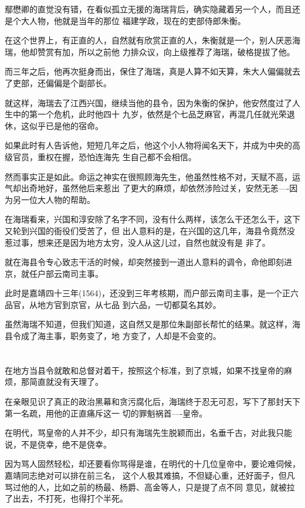 \documentclass[11pt,a4paper,onecolumn]{article}
\begin{document}
鄢懋卿的直觉没有错，在看似孤立无援的海瑞背后，确实隐藏着另一个人，而且还是个大人物，他就是当年的那位
福建学政，现在的吏部侍郎朱衡。

在这个世界上，有正直的人，自然就有欣赏正直的人，朱衡就是一个，别人厌恶海瑞，他却赞赏有加，所以之前他
力排众议，向上级推荐了海瑞，破格提拔了他。

而三年之后，他再次挺身而出，保住了海瑞，真是人算不如天算，朱大人偏偏就去了吏部，还偏偏是个副部长。

就这样，海瑞去了江西兴国，继续当他的县令，因为朱衡的保护，他安然度过了人生中的第一个危机，此时他四十
九岁，依然是个七品芝麻官，再混几任就光荣退休，这似乎已是他的宿命。

如果此时有人告诉他，短短几年之后，他这个小人物将闻名天下，并成为中央的高级官员，重权在握，恐怕连海先
生自己都不会相信。

然而事实正是如此。命运之神实在很照顾海先生，他虽然性格不对，天赋不高，运气却出奇地好，虽然他后来惹出
了更大的麻烦，却依然涉险过关，安然无恙----因为另一位大人物的帮助。

在海瑞看来，兴国和淳安除了名字不同，没有什么两样，该怎么干还怎么干，这下又轮到兴国的衙役们受苦了，但
出人意料的是，在兴国的这几年，海县令竟然没惹过事，想来还是因为地方太穷，没人从这儿过，自然也就没有是
非了。

就在海县令专心致志干活的时候，却突然接到一道出人意料的调令，命他即刻进京，就任户部云南司主事。

此时是嘉靖四十三年(1564)，还没到三年考核期，而户部云南司主事，是一个正六品官，从地方官到京官，从七品
到六品，一切都莫名其妙。

虽然海瑞不知道，但我们知道，这自然又是那位朱副部长帮忙的结果。就这样，海县令成了海主事，职务变了，地
方变了，人却是不会变的。

\section[\thesection]{}

在地方当县令就敢和总督对着干，按照这个标准，到了京城，如果不找皇帝的麻烦，那简直就没有天理了。

在亲眼见识了真正的政治黑幕和贪污腐化后，海瑞终于忍无可忍，写下了那封天下第一名疏，用他的正直痛斥这一
切的罪魁祸首----皇帝。

在明代，骂皇帝的人并不少，却只有海瑞先生脱颖而出，名垂千古，对此我只能说，不是侥幸，绝不是侥幸。

因为骂人固然轻松，却还要看你骂得是谁，在明代的十几位皇帝中，要论难伺候，嘉靖同志绝对可以排在前三名，
这个人极其难搞，不但疑心重，还好面子，但凡骂过他的人，比如之前的杨最、杨爵、高金等人，只是提了点不同
意见，就被拉了出去，不打死，也得打个半死。
\end{document}
